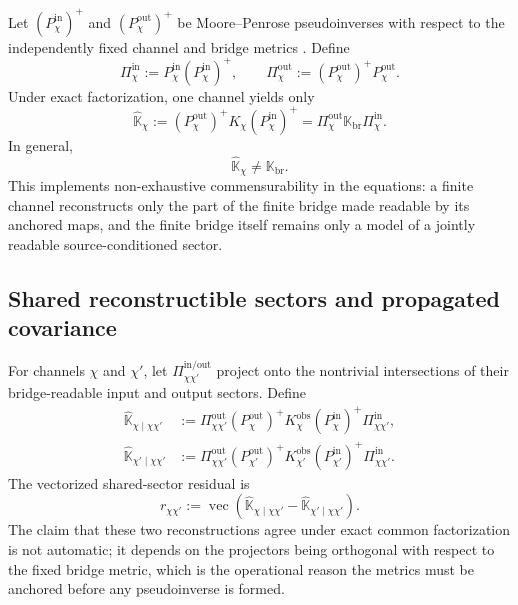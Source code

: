 \documentclass[11pt]{article}
\begin{document}
Let \((P_{\chi}^{\mathrm{in}})^{+}\) and \((P_{\chi}^{\mathrm{out}})^{+}\) be Moore--Penrose pseudoinverses with respect to the independently fixed channel and bridge metrics \cite{BenIsraelGreville2003}. Define
\begin{equation}
\Pi_{\chi}^{\mathrm{in}}
:=P_{\chi}^{\mathrm{in}}(P_{\chi}^{\mathrm{in}})^{+},
\qquad
\Pi_{\chi}^{\mathrm{out}}
:=(P_{\chi}^{\mathrm{out}})^{+}P_{\chi}^{\mathrm{out}}.
\label{eq:bridge_projectors}
\end{equation}
Under exact factorization, one channel yields only
\begin{equation}
\widehat{\mathbb K}_{\chi}
:=(P_{\chi}^{\mathrm{out}})^{+}
K_{\chi}
(P_{\chi}^{\mathrm{in}})^{+}
=
\Pi_{\chi}^{\mathrm{out}}
\mathbb K_{\mathrm{br}}
\Pi_{\chi}^{\mathrm{in}}.
\label{eq:partial_reconstruction}
\end{equation}
In general,
\begin{equation}
\widehat{\mathbb K}_{\chi}\neq\mathbb K_{\mathrm{br}}.
\end{equation}
This implements non-exhaustive commensurability in the equations: a finite channel reconstructs only the part of the finite bridge made readable by its anchored maps, and the finite bridge itself remains only a model of a jointly readable source-conditioned sector.

\subsection{Shared reconstructible sectors and propagated covariance}

For channels \(\chi\) and \(\chi'\), let \(\Pi_{\chi\chi'}^{\mathrm{in/out}}\) project onto the nontrivial intersections of their bridge-readable input and output sectors. Define
\begin{align}
\widehat{\mathbb K}_{\chi\mid\chi\chi'}
&:=
\Pi_{\chi\chi'}^{\mathrm{out}}
(P_{\chi}^{\mathrm{out}})^{+}
K_{\chi}^{\mathrm{obs}}
(P_{\chi}^{\mathrm{in}})^{+}
\Pi_{\chi\chi'}^{\mathrm{in}},\\
\widehat{\mathbb K}_{\chi'\mid\chi\chi'}
&:=
\Pi_{\chi\chi'}^{\mathrm{out}}
(P_{\chi'}^{\mathrm{out}})^{+}
K_{\chi'}^{\mathrm{obs}}
(P_{\chi'}^{\mathrm{in}})^{+}
\Pi_{\chi\chi'}^{\mathrm{in}}.
\label{eq:shared_reconstructions}
\end{align}
The vectorized shared-sector residual is
\begin{equation}
r_{\chi\chi'}
:=\operatorname{vec}
\left(
\widehat{\mathbb K}_{\chi\mid\chi\chi'}
-
\widehat{\mathbb K}_{\chi'\mid\chi\chi'}
\right).
\label{eq:shared_residual}
\end{equation}
The claim that these two reconstructions agree under exact common factorization is not automatic; it depends on the projectors being orthogonal with respect to the fixed bridge metric, which is the operational reason the metrics must be anchored before any pseudoinverse is formed.
\end{document}

